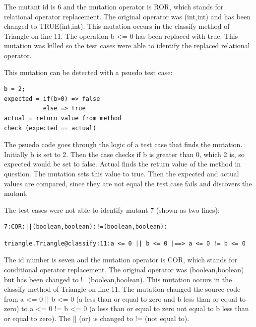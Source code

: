 \documentclass[12pt]{article}
\begin{document}
The mutant id is 6 and the mutation operator is ROR, which stands for relational operator replacement. The original operator was (int,int) and has been changed to TRUE(int,int). This mutation occurs in the classify method of Triangle on line 11. The operation b <= 0 has been replaced with true. This mutation was killed so the test cases were able to identify the replaced relational operator.

\par This mutation can be detected with a psuedo test case:\\

\begin{lstlisting}
b = 2; 
expected = if(b>0) => false 
           else => true  
actual = return value from method 
check (expected == actual) 
\end{lstlisting}
        
The psuedo code goes through the logic of a test case that finds the mutation. Initially b is set to 2. Then the case checks if b is greater than 0, which 2 is, so expected would be set to false. Actual finds the return value of the method in question. The mutation sets this value to true. Then the expected and actual values are compared, since they are not equal the test case fails and discovers the mutant.

\par The test cases were not able to identify mutant 7 (shown as two lines):\\ 

\begin{small}
\begin{lstlisting}
7:COR:||(boolean,boolean):!=(boolean,boolean):
\end{lstlisting}  
\begin{lstlisting}
triangle.Triangle@classify:11:a <= 0 || b <= 0 |==> a <= 0 != b <= 0
\end{lstlisting}
\end{small}

The id number is seven and the mutation operator is COR, which stands for conditional operator replacement. The original operator was (boolean,boolean) but has been changed to !=(boolean,boolean). This mutation occurs in the classify method of Triangle on line 11. The mutation changed the source code from a <= 0 || b <= 0 (a less than or equal to zero and b less than or equal to zero) to a <= 0 != b <= 0 (a less than or equal to zero not equal to b less than or equal to zero). The || (or) is changed to != (not equal to).
\end{document}

